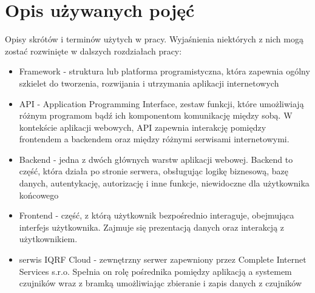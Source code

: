\section{Opis używanych pojęć}

Opisy skrótów i terminów użytych w pracy. Wyjaśnienia niektórych z nich mogą zostać rozwinięte w dalszych
rozdziałach pracy:
\begin{itemize}
    \item Framework - struktura lub platforma programistyczna, która 
    zapewnia ogólny szkielet do tworzenia, rozwijania i utrzymania aplikacji internetowych
    \item API - Application Programming Interface, zestaw funkcji, które umożliwiają różnym 
    programom bądź ich komponentom komunikację między sobą. W kontekście aplikacji webowych, API zapewnia 
    interakcję pomiędzy frontendem a backendem oraz między różnymi serwisami internetowymi.
    \item Backend - jedna z dwóch głównych warstw aplikacji webowej. Backend to część, która 
    działa po stronie serwera, obsługując logikę biznesową, bazę danych, autentykację, autorizację i inne funkcje, 
    niewidoczne dla użytkownika końcowego
    \item Frontend - część, z którą użytkownik bezpośrednio interaguje, obejmująca interfejs użytkownika.
    Zajmuje się prezentacją danych oraz interakcją z użytkownikiem.
    \item serwis IQRF Cloud - zewnętrzny serwer zapewniony przez Complete Internet Services s.r.o. Spełnia on 
rolę pośrednika pomiędzy aplikacją a systemem czujników wraz z bramką umożliwiając zbieranie i zapis danych z czujników 
    
\end{itemize}